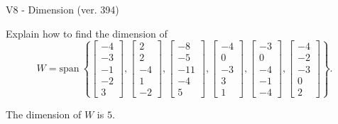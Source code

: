 \begin{exercise}
  \begin{exerciseTitle}V8 - Dimension (ver. 394)\end{exerciseTitle}
  \begin{exerciseStatement}
    Explain how to find the dimension of 
\[W=\mathrm{span}\ \left\{\left[\begin{array}{r}
-4 \\
-3 \\
-1 \\
-2 \\
3
\end{array}\right] , \left[\begin{array}{r}
2 \\
2 \\
-4 \\
1 \\
-2
\end{array}\right] , \left[\begin{array}{r}
-8 \\
-5 \\
-11 \\
-4 \\
5
\end{array}\right] , \left[\begin{array}{r}
-4 \\
0 \\
-3 \\
3 \\
1
\end{array}\right] , \left[\begin{array}{r}
-3 \\
0 \\
-4 \\
-1 \\
-4
\end{array}\right] , \left[\begin{array}{r}
-4 \\
-2 \\
-3 \\
0 \\
2
\end{array}\right]\right\}.\]



  \end{exerciseStatement}
  \begin{exerciseAnswer}
   The dimension of \(W\) is  \(5\).
  


  \end{exerciseAnswer}
\end{exercise}